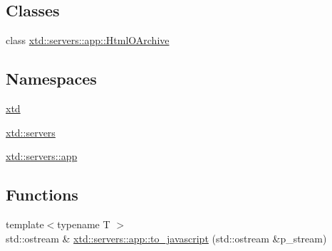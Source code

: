\subsection*{Classes}
\begin{DoxyCompactItemize}
\item 
class \hyperlink{classxtd_1_1servers_1_1app_1_1HtmlOArchive}{xtd\-::servers\-::app\-::\-Html\-O\-Archive}
\end{DoxyCompactItemize}
\subsection*{Namespaces}
\begin{DoxyCompactItemize}
\item 
\hyperlink{namespacextd}{xtd}
\item 
\hyperlink{namespacextd_1_1servers}{xtd\-::servers}
\item 
\hyperlink{namespacextd_1_1servers_1_1app}{xtd\-::servers\-::app}
\end{DoxyCompactItemize}
\subsection*{Functions}
\begin{DoxyCompactItemize}
\item 
{\footnotesize template$<$typename T $>$ }\\std\-::ostream \& \hyperlink{namespacextd_1_1servers_1_1app_afbe4f1864152231ae4e2be0b57509ab1}{xtd\-::servers\-::app\-::to\-\_\-javascript} (std\-::ostream \&p\-\_\-stream)
\end{DoxyCompactItemize}
